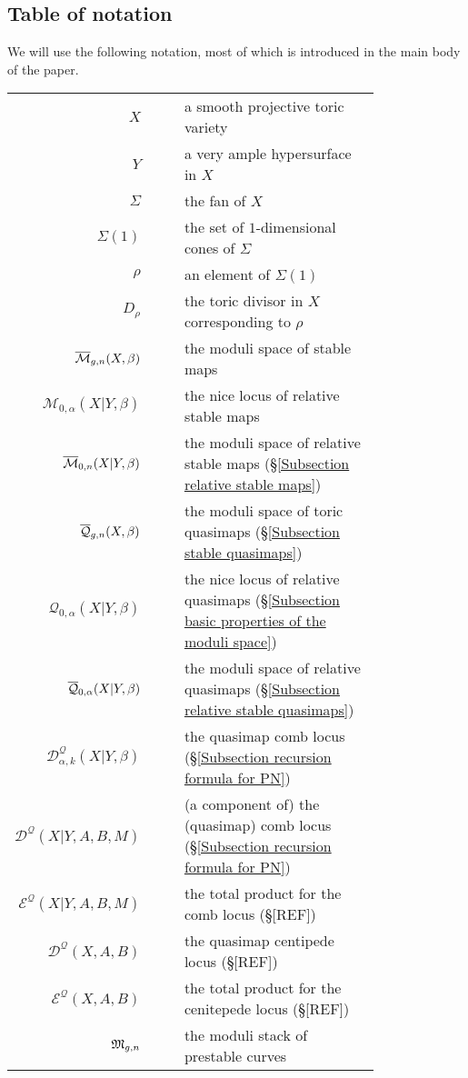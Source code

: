 \subsection{Table of notation} We will use the following notation, most of which is introduced in the main body of the paper.
\begin{longtabu}{r c c p{0.8\linewidth}}
$X$ & & & a smooth projective toric variety \\
$Y$ & & & a very ample hypersurface in $X$ \\
$\Sigma$ & & & the fan of $X$ \\
$\Sigma(1)$ & & & the set of $1$-dimensional cones of $\Sigma$ \\
$\rho$ & & & an element of $\Sigma(1)$ \\
$D_\rho$ & & & the toric divisor in $X$ corresponding to $\rho$ \\
$\overline{\mathcal M}_{g,n}(X,\beta)$ & & & the moduli space of stable maps \\
$\mathcal{M}_{0,\alpha}(X|Y,\beta)$ & & & the nice locus of relative stable maps \\
$\overline{\mathcal M}_{0,n}(X|Y,\beta)$ & & & the moduli space of relative stable maps (\S \ref{Subsection relative stable maps}) \\
$\overline{\mathcal Q}_{g,n}(X,\beta)$ & & & the moduli space of toric quasimaps (\S \ref{Subsection stable quasimaps}) \\
$\mathcal{Q}_{0,\alpha}(X|Y,\beta)$ & & & the nice locus of relative quasimaps (\S \ref{Subsection basic properties of the moduli space}) \\
$\overline{\mathcal Q}_{0,\alpha}(X|Y,\beta)$ & & & the moduli space of relative quasimaps (\S \ref{Subsection relative stable quasimaps}) \\
$\mathcal{D}^{\mathcal{Q}}_{\alpha,k}(X|Y,\beta)$ & & & the quasimap comb locus (\S \ref{Subsection recursion formula for PN}) \\
$\mathcal{D}^{\mathcal{Q}}(X|Y,A,B,M)$ & & & (a component of) the (quasimap) comb locus (\S \ref{Subsection recursion formula for PN}) \\
$\mathcal{E}^{\mathcal{Q}}(X|Y,A,B,M)$ & & & the total product for the comb locus (\S [REF]) \\
$\mathcal{D}^{\mathcal{Q}}(X,A,B)$ & & & the quasimap centipede locus (\S [REF])  \\
$\mathcal{E}^{\mathcal{Q}}(X,A,B)$ & & & the total product for the cenitepede locus (\S [REF]) \\
$\mathfrak M_{g,n}$ & & & the moduli stack of prestable curves \\

\end{longtabu}
